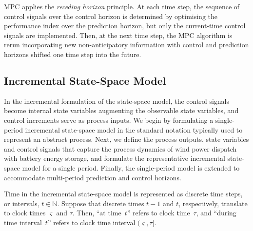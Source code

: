 \documentclass[conference]{IEEEtran}
\def\N{\mathbb{N}}
\begin{document}
MPC applies the \textit{receding horizon} principle.  At each time step, the sequence of control signals over the control horizon is determined by optimising the performance index over the prediction horizon, but only the current-time control signals are implemented.  Then, at the next time step, the MPC algorithm is rerun incorporating new non-anticipatory information with control and prediction horizons shifted one time step into the future.     

\subsection{Incremental State-Space Model}\label{sect:state_space_model}
In the incremental formulation of the state-space model, the control signals become internal state variables augmenting the observable state variables, and control increments serve as process inputs.  We begin by formulating a single-period incremental state-space model in the standard notation typically used to represent an abstract process.  Next, we define the process outputs, state variables and control signals that capture the process dynamics of wind power dispatch with battery energy storage, and formulate the representative incremental state-space model for a single period.  Finally, the single-period model is extended to accommodate multi-period prediction and control horizons.

Time in the incremental state-space model is represented as discrete time steps, or intervals, $t\in\N$.  Suppose that discrete times $t\!-\!1$ and $t$, respectively, translate to clock times $\varsigma$ and $\tau$.  Then, ``at time~$t$'' refers to clock time~$\tau$, and ``during time interval~$t$'' refers to clock time interval $(\varsigma, \tau]$.
\end{document}
